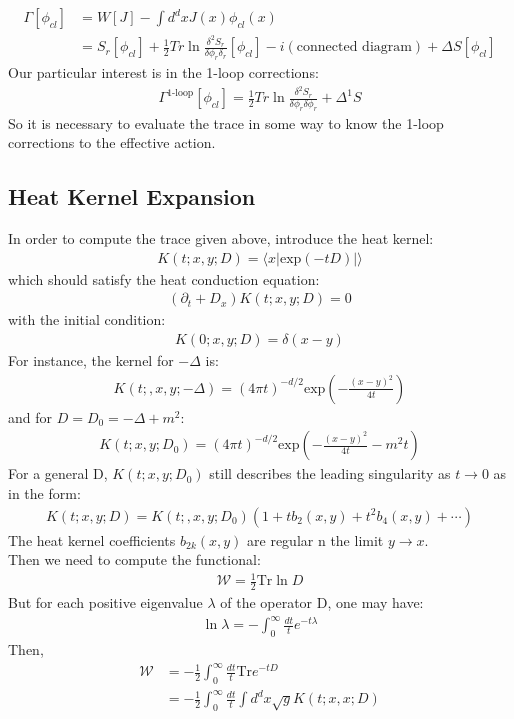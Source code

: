 \documentclass[fleqn]{article}
\begin{document}
\begin{align}
\Gamma [\phi_{cl}] &= W[J] - \int d^{d}x J(x)\phi_{cl} (x) \\
&= S_{r}[\phi _{cl}] +\frac{1}{2} Tr \ln \frac{\delta ^{2} S_{r}}{\delta \phi _{r} \delta _{r}}[\phi _{cl}] - i(\text{connected diagram}) + \Delta S[\phi_{cl}]
\end{align}
Our particular interest is in the 1-loop corrections:
\begin{align}
\Gamma^{\text{1-loop}} [\phi_{cl}]  = \frac{1}{2}Tr \ln \frac{\delta ^{2} S_{r}} {\delta \phi_{r} \delta \phi_{r}} + \Delta ^{1} S
\end{align}
So it is necessary to evaluate the trace in some way to know the 1-loop corrections to the effective action.

\subsection{Heat Kernel Expansion}
In order to compute the trace given above, introduce the heat kernel:
\begin{align}
K(t;x,y;D) = \langle x | \text{exp}(-tD) | \rangle
\end{align}
which should satisfy the heat conduction equation:
\begin{align}
(\partial _{t} + D_{x})K(t;x,y;D) = 0
\end{align}
with the initial condition:
\begin{align}
K(0;x,y;D) = \delta (x-y)
\end{align}
For instance, the kernel for $-\Delta$ is:
\begin{align}
K(t;,x,y;-\Delta) = (4\pi t)^{-d/2} \text{exp}(-\frac{(x-y)^{2}}{4t})
\end{align}
and for $D= D_{0} = -\Delta + m^{2}$:
\begin{align}
K(t;x,y;D_{0}) = (4\pi t)^{-d/2} \text{exp}(-\frac{(x-y)^{2}}{4t} - m^{2} t)
\end{align}
For a general D, $K(t;x,y;D_{0})$ still describes the leading singularity as $t \rightarrow 0$ as in the form:
\begin{align}
K(t;x,y;D) = K(t;,x,y;D_{0}) (1 + tb_{2}(x,y) + t^{2} b_{4}(x,y) + \cdots)
\end{align}
The heat kernel coefficients $b_{2k}(x,y)$ are regular n the limit $y \rightarrow x$.\\
Then we need to compute the functional:
\begin{align}
\mathcal{W} = \frac{1}{2} \text{Tr} \ln D
\end{align}
But for each positive eigenvalue $\lambda$  of the operator D, one may have:
\begin{align}
\ln \lambda = - \int_{0}^{\infty} \frac{dt}{t} e^{-t\lambda}
\end{align}
Then,
\begin{align}
\mathcal{W} &=  -\frac{1}{2} \int_{0}^{\infty} \frac{dt}{t} \text{Tr} e^{-tD} \nonumber \\
&= -\frac{1}{2} \int_{0}^{\infty} \frac{dt}{t} \int d^{d}x \sqrt{g} K(t;x,x;D)
\end{align}
\end{document}
